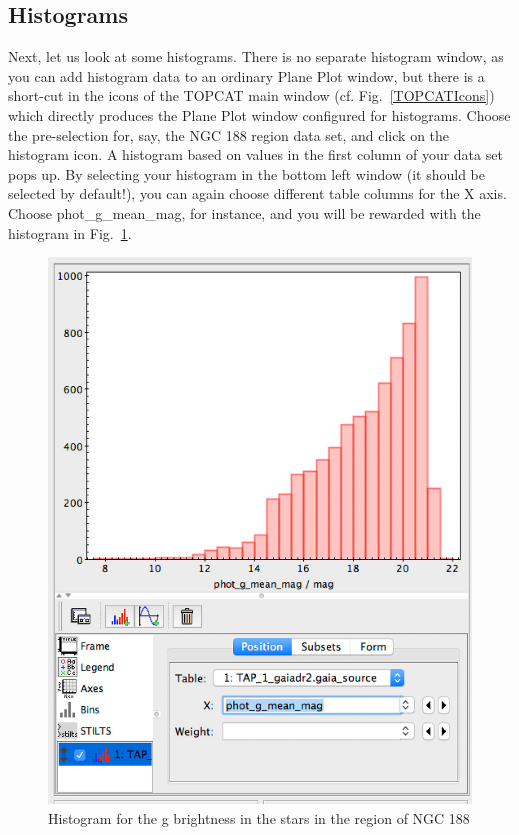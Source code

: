 \documentclass[twocolumn,apj]{openjournal}
\begin{document}
\subsection{Histograms}
\label{TOPCAThistogram}
Next, let us look at some histograms. There is no separate histogram window, as you can add histogram data to an ordinary Plane Plot window, but there is a short-cut in the icons of the TOPCAT main window (cf. Fig.~\ref{TOPCATIcons}) which directly produces the Plane Plot window configured for histograms. Choose the pre-selection for, say, the NGC 188 region data set, and click on the histogram icon. A histogram based on values in the first column of your data set pops up. By selecting your histogram in the bottom left window (it should be selected by default!), you can again choose different table columns for the X axis. Choose phot\_g\_mean\_mag, for instance, and you will be rewarded with the histogram in Fig.~\ref{NGC188Histogram}.
\begin{figure}[htbp]
\begin{center}
\includegraphics[width=\linewidth]{ngc188hist.jpg}
\caption{Histogram for the g brightness in the stars in the region of NGC 188}
\label{NGC188Histogram}
\end{center}
\end{figure}
\end{document}
